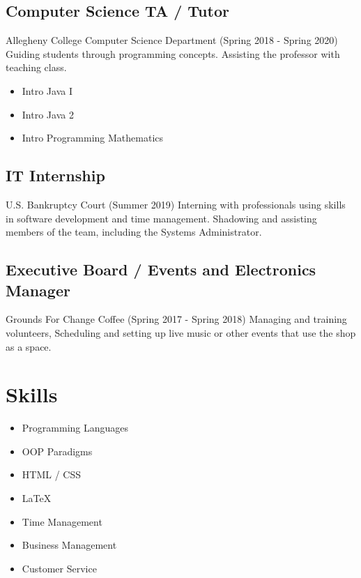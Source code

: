 \documentclass[12pt]{article}
\begin{document}
\subsection*{Computer Science TA / Tutor}
Allegheny College Computer Science Department (Spring 2018 - Spring 2020)
Guiding students through programming concepts. Assisting the professor with teaching class.

\begin{multicols}{2}
\begin{itemize}
    \item Intro Java I
    \item Intro Java 2
    \item Intro Programming Mathematics
\end{itemize}
\end{multicols}

\subsection*{IT Internship}
U.S. Bankruptcy Court (Summer 2019)
Interning with professionals using skills in software development and time management. Shadowing and assisting members of the team, including the Systems Administrator.

\subsection*{Executive Board / Events and Electronics Manager}
Grounds For Change Coffee (Spring 2017 - Spring 2018)
Managing and training volunteers, Scheduling and setting up live music or other events that use the shop as a space.



\section*{Skills}

\begin{multicols}{2}
\begin{itemize}
    \item Programming Languages
    \item OOP Paradigms
    \item HTML / CSS
    \item \LaTeX
    \item Time Management
    \item Business Management
    \item Customer Service
\end{itemize}
\end{multicols}
\end{document}
